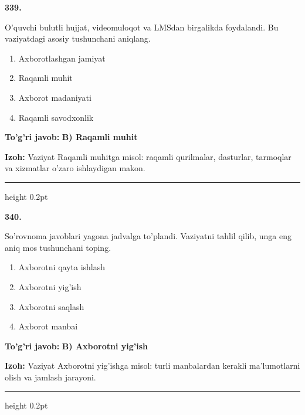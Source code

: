 \documentclass[10pt,a4paper,oneside]{article}
\begin{document}
\noindent\textbf{\color{ink}339.}
\par
O'quvchi bulutli hujjat, videomuloqot va LMSdan birgalikda foydalandi. Bu vaziyatdagi asosiy tushunchani aniqlang.
\begin{enumerate}[label=\Alph*),leftmargin=9mm]
\item Axborotlashgan jamiyat
\item Raqamli muhit
\item Axborot madaniyati
\item Raqamli savodxonlik
\end{enumerate}
\begin{tcolorbox}[enhanced,breakable,colback=teal!4,colframe=teal!50!black,boxrule=0.5pt,arc=1.1mm,left=3mm,right=3mm,top=1.7mm,bottom=1.7mm,before skip=2mm,after skip=2mm]
\textbf{\color{teal}To'g'ri javob:} \textbf{B) Raqamli muhit}
\par\smallskip
\textbf{Izoh:} Vaziyat Raqamli muhitga misol: raqamli qurilmalar, dasturlar, tarmoqlar va xizmatlar o'zaro ishlaydigan makon.
\end{tcolorbox}
\vspace{2mm}\hrule height 0.2pt \vspace{3mm}

\noindent\textbf{\color{ink}340.}
\par
So'rovnoma javoblari yagona jadvalga to'plandi. Vaziyatni tahlil qilib, unga eng aniq mos tushunchani toping.
\begin{enumerate}[label=\Alph*),leftmargin=9mm]
\item Axborotni qayta ishlash
\item Axborotni yig'ish
\item Axborotni saqlash
\item Axborot manbai
\end{enumerate}
\begin{tcolorbox}[enhanced,breakable,colback=teal!4,colframe=teal!50!black,boxrule=0.5pt,arc=1.1mm,left=3mm,right=3mm,top=1.7mm,bottom=1.7mm,before skip=2mm,after skip=2mm]
\textbf{\color{teal}To'g'ri javob:} \textbf{B) Axborotni yig'ish}
\par\smallskip
\textbf{Izoh:} Vaziyat Axborotni yig'ishga misol: turli manbalardan kerakli ma'lumotlarni olish va jamlash jarayoni.
\end{tcolorbox}
\vspace{2mm}\hrule height 0.2pt \vspace{3mm}
\end{document}
